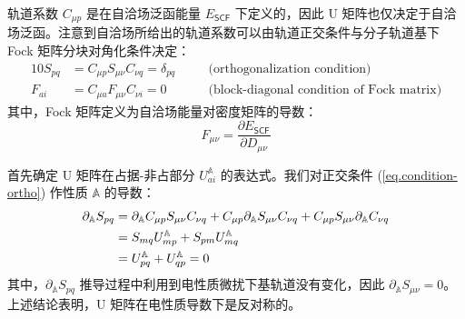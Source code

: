 轨道系数 $C_{\mu p}$ 是在自洽场泛函能量 $E_\textsf{SCF}$ 下定义的，因此 U 矩阵也仅决定于自洽场泛函。注意到自洽场所给出的轨道系数可以由轨道正交条件与分子轨道基下 Fock 矩阵分块对角化条件决定：
\begin{alignat}{10}
  \label{eq.condition-ortho}
  S_{pq} &= C_{\mu p} S_{\mu \nu} C_{\nu q} = \delta_{pq} &&\quad \text{(orthogonalization condition)} \\
  \label{eq.condition-Fai}
  F_{ai} &= C_{\mu a} F_{\mu \nu} C_{\nu i} = 0 &&\quad \text{(block-diagonal condition of Fock matrix)}
\end{alignat}
其中，Fock 矩阵定义为自洽场能量对密度矩阵的导数：
\begin{equation}
  F_{\mu \nu} = \frac{\partial E_\textsf{SCF}}{\partial D_{\mu \nu}}
\end{equation}

首先确定 U 矩阵在占据-非占部分 $U_{ai}^\mathbb{A}$ 的表达式。我们对正交条件 (\ref{eq.condition-ortho}) 作性质 $\mathbb{A}$ 的导数：
\begin{align}
  \label{eq.condition-ortho-conclusion}
  \partial_{\mathbb{A}} S_{pq} &= \partial_\mathbb{A} C_{\mu p} S_{\mu \nu} C_{\nu q} + C_{\mu p} \partial_\mathbb{A} S_{\mu \nu} C_{\nu q} + C_{\mu p} S_{\mu \nu} \partial_\mathbb{A} C_{\nu q} \notag\\
  &= S_{mq} U_{mp}^\mathbb{A} + S_{pm} U_{mq}^\mathbb{A} \notag\\
  &= U_{pq}^\mathbb{A} + U_{qp}^\mathbb{A} = 0
\end{align}
其中，$\partial_\mathbb{A} S_{pq}$ 推导过程中利用到电性质微扰下基轨道没有变化，因此 $\partial_\mathbb{A} S_{\mu \nu} = 0$。上述结论表明，U 矩阵在电性质导数下是反对称的。

